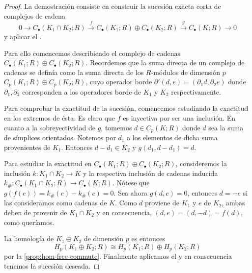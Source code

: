 \begin{proof}
	La demostración consiste en construir la sucesión exacta corta de complejos de
	cadena
	\[
		0 \to C_{\bullet}(K_{1} \cap K_{2};R) \overset{f}{\to}C_{\bullet}(K_{1};R) \oplus
		C_{\bullet}(K_{2};R) \overset{g}{\to}C_{\bullet}(K;R) \to 0
	\]
	y aplicar el .

	Para ello comencemos describiendo el complejo de cadenas
	\(C_{\bullet}(K_{1};R) \oplus C_{\bullet}(K_{2};R)\). Recordemos que la suma directa
	de un complejo de cadenas se definía como la suma directa de los \(R\)-módulos de
	dimensión \(p\) \(C_{p}(K_{1};R) \oplus C_{p}(K_{2};R)\), cuyo operador borde
	\(\partial'(d,e) = (\partial_{1}d, \partial_{2} e)\) donde
	\(\partial_{1}, \partial_{2}\) corresponden a los operadores borde de \(K_{1}\) y
	\(K_{2}\) respectivamente.

	Para comprobar la exactitud de la sucesión, comencemos estudiando la exactitud
	en los extremos de ésta. Es claro que \(f\) es inyectiva por ser una inclusión. En
	cuanto a la sobreyectividad de \(g\), tomemos \(d \in C_{p}(K;R)\) donde \(d\) sea
	la suma de símplices orientados. Notemos por \(d_{1}\) a los elementos de dicha suma
	provenientes de \(K_{1}\). Entonces \(d - d_{1} \in K_{2}\) y
	\(g(d_{1}, d-d_{1}) = d\).

	Para estudiar la exactitud en
	\(C_{\bullet}(K_{1};R) \oplus C_{\bullet}(K_{2};R)\), consideremos la inclusión \(k
	: K_{1} \cap K_{2} \to K\) y la respectiva inclusión de cadenas inducida \(k_{\#}
	: C_{\bullet}(K_{1} \cap K_{2};R) \to C_{\bullet}(K;R)\). Nótese que
	\(g(f(c)) = k_{\#}(c) - k_{\#}(c) = 0\). Sea ahora \(g(d,e) = 0\), entonces
	\(d = -e\) si las consideramos como cadenas de \(K\). Como \(d\) proviene de \(K_{1}\)
	y \(e\) de \(K_{2}\), ambas deben de provenir de \(K_{1} \cap K_{2}\) y en
	consecuencia, \((d,e) = (d,-d) = f(d)\), como queríamos.

	La homología de \(K_{1} \oplus K_{2}\) de dimensión \(p\) es entonces
	\[
		H_{p}(K_{1} \oplus K_{2};R) \cong H_{p}(K_{1};R) \oplus H_{p}(K_{2};R)
	\]
	por la \autoref{prop:hom-free-commute}. Finalmente aplicamos el 
	y en consecuencia tenemos la sucesión deseada.


\end{proof}
